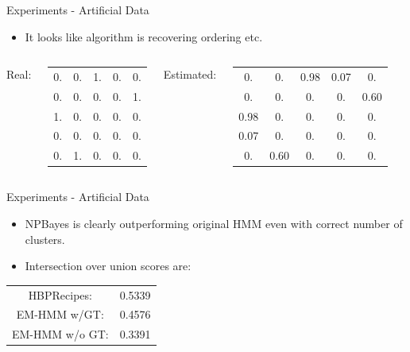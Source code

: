 \begin{frame}{Experiments - Artificial Data}
\begin{itemize}
\item It looks like algorithm is recovering ordering etc.
\end{itemize}
\begin{columns}[c]
Real:
\begin{table}
  \begin{center}
    \begin{tabular}{ccccc}
0.     &    0.   &       1.      &    0.      &    0. \\
0.     &     0.     &     0.     &     0.       &   1.   \\
1.     &     0.     &     0.      &    0.	  &  0. \\
 0.    &      0.     &     0.	    &   0.    &      0.	 \\
 0.    &      1.     &     0.  	  &     0.	&   0.
    \end{tabular}
  \end{center}
\end{table}
Estimated:
\hspace{-15mm}
\begin{table}
  \begin{center}
    \begin{tabular}{ccccc}
0.     &    0.   &      0.98  & 0.07      &    0. \\
0.     &     0.     &     0.     &     0.       &   0.60  \\
0.98     &     0.     &     0.      &    0.	  &  0. \\
 0.07     &      0.     &     0.	    &   0.    &      0.	 \\
 0.    &      0.60    &     0.  	  &     0.	&   0.
    \end{tabular}
  \end{center}
\end{table}

\end{columns}
\end{frame}


\begin{frame}{Experiments - Artificial Data}
\begin{itemize}
\item NPBayes is clearly outperforming original HMM even with correct number of clusters.
\item Intersection over union scores are:
\end{itemize}

\begin{table}
  \begin{tabular}{cc}
HBPRecipes: & 0.5339 \\ EM-HMM w/GT: & 0.4576 \\ EM-HMM w/o GT: & 0.3391
\end{tabular}
\end{table}
\end{frame}


